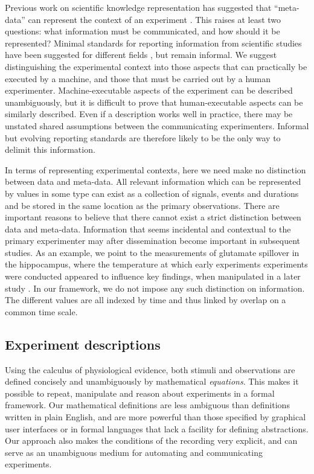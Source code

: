 Previous work on scientific knowledge representation has suggested
that ``meta-data'' can represent the context of an experiment
\cite{Bower2009}. This raises at least two questions: what
information must be communicated, and how should it be represented?
Minimal standards for reporting information from scientific studies
have been suggested for different fields
\cite{Taylor2007,Gibson2008}, but remain informal. We suggest
distinguishing the experimental context into those aspects that can
practically be executed by a machine, and those that must be carried
out by a human experimenter. Machine-executable aspects of the
experiment can be described unambiguously, but it is difficult to prove
that human-executable aspects can be similarly described. Even if a
description works well in practice, there may be unstated shared assumptions
between the communicating experimenters. Informal but evolving reporting
standards are therefore likely to be the only way to delimit this information.

In terms of representing experimental contexts, here we need make no
distinction between data and meta-data. All relevant information which
can be represented by values in some type can exist as a collection of
signals, events and durations and be stored in the same location as
the primary observations. There are important reasons to believe that
there cannot exist a strict distinction between data and
meta-data. Information that seems incidental and contextual to the
primary experimenter may after dissemination become important in
subsequent studies. As an example, we point to the measurements of
glutamate spillover in the hippocampus, where the temperature at which
early experiments \cite{Kullmann1996} experiments were conducted
appeared to influence key findings, when manipulated in a later
study \cite{Asztely1997}.  In our framework, we do not impose any
such distinction on information. The different values are all indexed
by time and thus linked by overlap on a common time scale.

\subsection*{Experiment descriptions}

Using the calculus of physiological evidence, both stimuli and
observations are defined concisely and unambiguously by mathematical
\emph{equations}. This makes it possible to repeat, manipulate and
reason about experiments in a formal framework. Our mathematical
definitions are less ambiguous than definitions written in plain
English, and are more powerful than those specified by graphical user
interfaces or in formal languages that lack a facility for defining
abstractions. Our approach also makes the conditions of the recording
very explicit, and can serve as an unambiguous medium for automating
and communicating experiments. 


